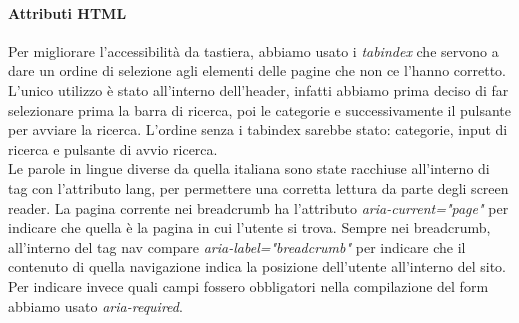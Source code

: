 \paragraph{Attributi HTML} Per migliorare l'accessibilità da tastiera, abbiamo usato i \textit{tabindex} che servono a dare un ordine di selezione agli elementi delle pagine che non ce l'hanno corretto. L'unico utilizzo è stato all'interno dell'header, infatti abbiamo prima deciso di far selezionare prima la barra di ricerca, poi le categorie e successivamente il pulsante per avviare la ricerca. L'ordine senza i tabindex sarebbe stato: categorie, input di ricerca e pulsante di avvio ricerca.\\
Le parole in lingue diverse da quella italiana sono state racchiuse all’interno di tag con l’attributo lang, per permettere una corretta lettura da parte degli screen reader. La pagina corrente nei breadcrumb ha l'attributo \textit{aria-current="page"} per indicare che quella è la pagina in cui l'utente si trova. Sempre nei breadcrumb, all'interno del tag nav compare \textit{aria-label="breadcrumb"} per indicare che il contenuto di quella navigazione indica la posizione dell'utente all'interno del sito.\\
Per indicare invece quali campi fossero obbligatori nella compilazione del form abbiamo usato \textit{aria-required}.